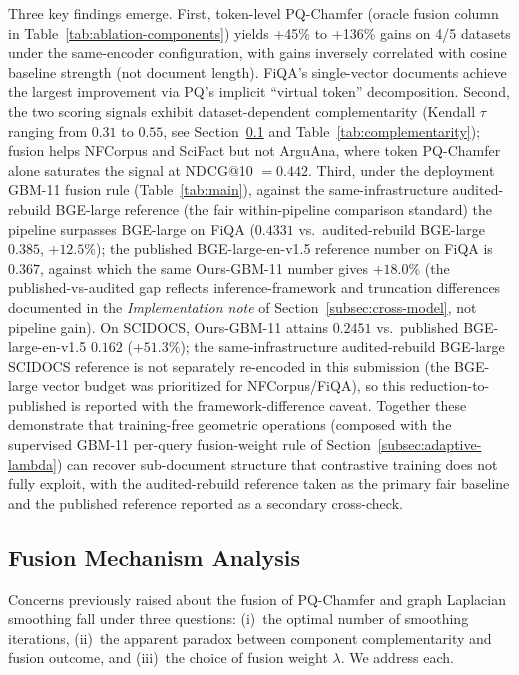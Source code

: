 \documentclass[review,1p]{elsarticle}
\begin{document}
Three key findings emerge. First, token-level PQ-Chamfer (oracle fusion column in Table~\ref{tab:ablation-components}) yields +45\% to +136\% gains on 4/5 datasets under the same-encoder configuration, with gains inversely correlated with cosine baseline strength (not document length). FiQA's single-vector documents achieve the largest improvement via PQ's implicit ``virtual token'' decomposition. Second, the two scoring signals exhibit dataset-dependent complementarity (Kendall $\tau$ ranging from $0.31$ to $0.55$, see Section~\ref{subsec:fusion-mechanism} and Table~\ref{tab:complementarity}); fusion helps NFCorpus and SciFact but not ArguAna, where token PQ-Chamfer alone saturates the signal at NDCG@10 $= 0.442$. Third, under the deployment GBM-11 fusion rule (Table~\ref{tab:main}), against the same-infrastructure audited-rebuild BGE-large reference (the fair within-pipeline comparison standard) the pipeline surpasses BGE-large on FiQA ($0.4331$ vs.\ audited-rebuild BGE-large $0.385$, $+12.5\%$); the published BGE-large-en-v1.5 reference number on FiQA is $0.367$, against which the same Ours-GBM-11 number gives $+18.0\%$ (the published-vs-audited gap reflects inference-framework and truncation differences documented in the \emph{Implementation note} of Section~\ref{subsec:cross-model}, not pipeline gain). On SCIDOCS, Ours-GBM-11 attains $0.2451$ vs.\ published BGE-large-en-v1.5 $0.162$ ($+51.3\%$); the same-infrastructure audited-rebuild BGE-large SCIDOCS reference is not separately re-encoded in this submission (the BGE-large vector budget was prioritized for NFCorpus/FiQA), so this reduction-to-published is reported with the framework-difference caveat. Together these demonstrate that training-free geometric operations (composed with the supervised GBM-11 per-query fusion-weight rule of Section~\ref{subsec:adaptive-lambda}) can recover sub-document structure that contrastive training does not fully exploit, with the audited-rebuild reference taken as the primary fair baseline and the published reference reported as a secondary cross-check.

\subsection{Fusion Mechanism Analysis}
\label{subsec:fusion-mechanism}

Concerns previously raised about the fusion of PQ-Chamfer and graph Laplacian smoothing fall under three questions: (i)~the optimal number of smoothing iterations, (ii)~the apparent paradox between component complementarity and fusion outcome, and (iii)~the choice of fusion weight $\lambda$. We address each.
\end{document}
